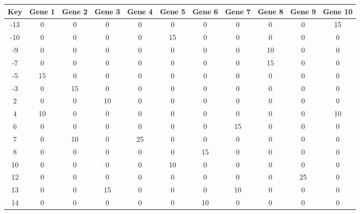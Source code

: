 \begin{tabular}{|c|c|c|c|c|c|c|c|c|c|c|}
\hline
Key & Gene 1 & Gene 2 & Gene 3 & Gene 4 & Gene 5 & Gene 6 & Gene 7 & Gene 8 & Gene 9 & Gene 10 \\
\hline
-13 & 0 & 0 & 0 & 0 & 0 & 0 & 0 & 0 & 0 & 15 \\
-10 & 0 & 0 & 0 & 0 & 15 & 0 & 0 & 0 & 0 & 0 \\
-9 & 0 & 0 & 0 & 0 & 0 & 0 & 0 & 10 & 0 & 0 \\
-7 & 0 & 0 & 0 & 0 & 0 & 0 & 0 & 15 & 0 & 0 \\
-5 & 15 & 0 & 0 & 0 & 0 & 0 & 0 & 0 & 0 & 0 \\
-3 & 0 & 15 & 0 & 0 & 0 & 0 & 0 & 0 & 0 & 0 \\
2 & 0 & 0 & 10 & 0 & 0 & 0 & 0 & 0 & 0 & 0 \\
4 & 10 & 0 & 0 & 0 & 0 & 0 & 0 & 0 & 0 & 10 \\
6 & 0 & 0 & 0 & 0 & 0 & 0 & 15 & 0 & 0 & 0 \\
7 & 0 & 10 & 0 & 25 & 0 & 0 & 0 & 0 & 0 & 0 \\
8 & 0 & 0 & 0 & 0 & 0 & 15 & 0 & 0 & 0 & 0 \\
10 & 0 & 0 & 0 & 0 & 10 & 0 & 0 & 0 & 0 & 0 \\
12 & 0 & 0 & 0 & 0 & 0 & 0 & 0 & 0 & 25 & 0 \\
13 & 0 & 0 & 15 & 0 & 0 & 0 & 10 & 0 & 0 & 0 \\
14 & 0 & 0 & 0 & 0 & 0 & 10 & 0 & 0 & 0 & 0 \\
\hline
\end{tabular}